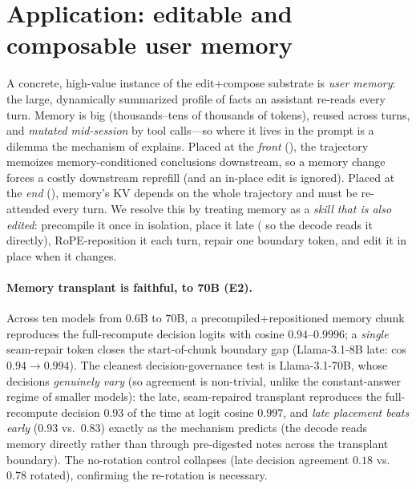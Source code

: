 \section{Application: editable and composable user memory}
\label{sec:memory}

A concrete, high-value instance of the edit+compose substrate is \emph{user memory}: the
large, dynamically summarized profile of facts an assistant re-reads every turn. Memory is
big (thousands--tens of thousands of tokens), reused across turns, and \emph{mutated mid-session}
by tool calls---so where it lives in the prompt is a dilemma the mechanism of
 explains. Placed at the \emph{front} (\note{[sys][MEM][traj]}), the
trajectory memoizes memory-conditioned conclusions downstream, so a memory change forces a
costly downstream reprefill (and an in-place edit is ignored). Placed at the \emph{end}
(\note{[sys][traj][MEM]}), memory's KV depends on the whole trajectory and must be re-attended
every turn. We resolve this by treating memory as a \emph{skill that is also edited}:
precompile it once in isolation, place it late (\note{[sys][traj][MEM][query]} so the decode
reads it directly), RoPE-reposition it each turn, repair one boundary token, and edit it in
place when it changes.

\paragraph{Memory transplant is faithful, to 70B (E2).} Across ten models from $0.6$B to
$70$B, a precompiled+repositioned memory chunk reproduces the full-recompute decision logits
with cosine $0.94$--$0.9996$; a \emph{single} seam-repair token closes the start-of-chunk
boundary gap (Llama-3.1-8B late: cos $0.94\rightarrow0.994$). The cleanest decision-governance
test is Llama-3.1-70B, whose decisions \emph{genuinely vary} (so agreement is non-trivial,
unlike the constant-answer regime of smaller models): the late, seam-repaired transplant
reproduces the full-recompute decision $0.93$ of the time at logit cosine $0.997$, and
\emph{late placement beats early} ($0.93$ vs.\ $0.83$) exactly as the mechanism predicts
(the decode reads memory directly rather than through pre-digested notes across the transplant
boundary). The no-rotation control collapses (late decision agreement $0.18$ vs.\ $0.78$
rotated), confirming the re-rotation is necessary.

